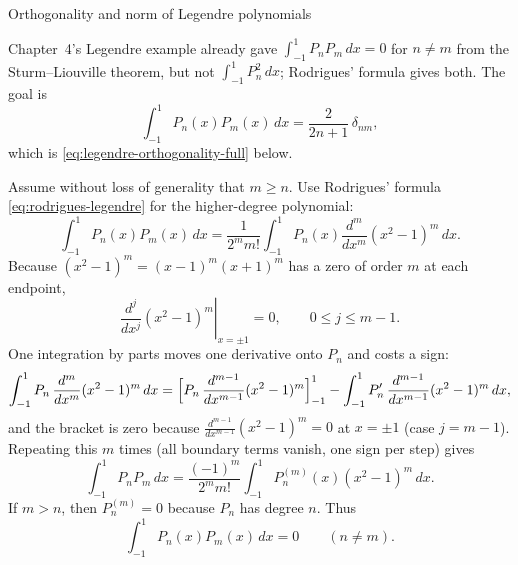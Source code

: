 \documentclass[11pt]{beamer}
\begin{document}
\begin{frame}[allowframebreaks=1.00]{Orthogonality and norm of Legendre polynomials}
\footnotesize

Chapter~4's Legendre example already gave $\int_{-1}^1P_nP_m\,dx=0$ for $n\ne m$ from the
Sturm--Liouville theorem, but not $\int_{-1}^1P_n^2\,dx$; Rodrigues' formula gives both. The
goal is
\[
 \int_{-1}^{1}P_n(x)P_m(x)\,dx=\frac{2}{2n+1}\,\delta_{nm},
\]
which is \eqref{eq:legendre-orthogonality-full} below.

Assume without loss of generality that $m\ge n$. Use Rodrigues' formula \eqref{eq:rodrigues-legendre} for
the higher-degree polynomial:
\[
 \int_{-1}^{1}P_n(x)P_m(x)\,dx
 =\frac{1}{2^m m!}\int_{-1}^{1}
 P_n(x)\frac{d^m}{dx^m}(x^2-1)^m\,dx.
\]
Because $(x^2-1)^m=(x-1)^m(x+1)^m$ has a zero of order $m$ at each endpoint,
\[
 \left.\frac{d^j}{dx^j}(x^2-1)^m\right|_{x=\pm1}=0,
 \qquad 0\le j\le m-1.
\]
One integration by parts moves one derivative onto $P_n$ and costs a sign:
\[
 \int_{-1}^{1}P_n\,\frac{d^m}{dx^m}(x^2-1)^m\,dx
 =\Bigl[P_n\,\frac{d^{m-1}}{dx^{m-1}}(x^2-1)^m\Bigr]_{-1}^{1}
 -\int_{-1}^{1}P_n'\,\frac{d^{m-1}}{dx^{m-1}}(x^2-1)^m\,dx,
\]
and the bracket is zero because $\frac{d^{m-1}}{dx^{m-1}}(x^2-1)^m=0$ at $x=\pm1$ (case $j=m-1$). Repeating this $m$ times (all boundary
terms vanish, one sign per step) gives
\begin{equation}
 \int_{-1}^{1}P_nP_m\,dx
 =\frac{(-1)^m}{2^m m!}\int_{-1}^{1}
 P_n^{(m)}(x)(x^2-1)^m\,dx.
 \label{eq:legendre-rodrigues-ibp}
\end{equation}
If $m>n$, then $P_n^{(m)}=0$ because $P_n$ has degree $n$. Thus
\begin{equation}
  \int_{-1}^{1}P_n(x)P_m(x)\,dx=0
  \qquad(n\ne m).
  \label{eq:legendre-orthogonal-zero}
\end{equation}


\end{frame}
\end{document}
